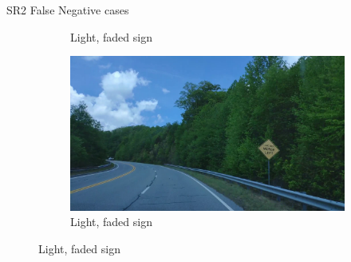 \documentclass{beamer}
\begin{document}
\begin{frame}{SR2 False Negative cases}
\begin{figure}
\begin{center}
\begin{subfigure}[t]{.49\linewidth}
          \caption{Light, faded sign}
        \end{subfigure}
        \begin{subfigure}[t]{.49\linewidth}
          \centering
          \includegraphics[width=0.99\linewidth]{figures/examples/sr2/FN/FN_08.png}
          \caption{Light, faded sign}
        \end{subfigure}
        \label{fig:FNcases}
      \end{center}
    \end{figure}
\end{frame}{}
\end{document}
